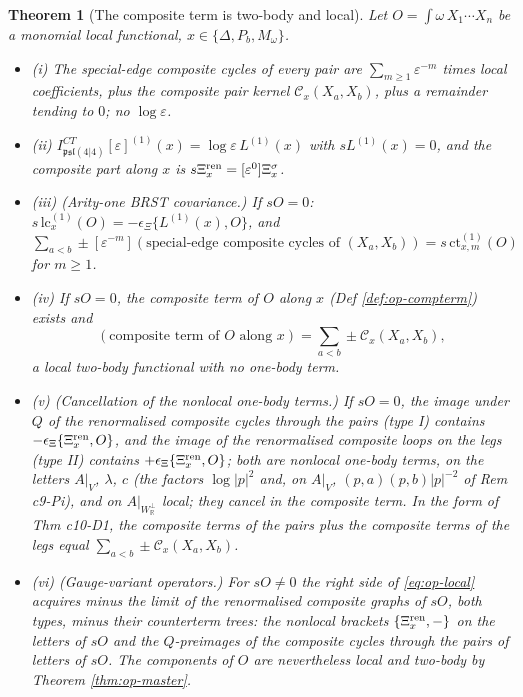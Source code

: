 \documentclass[11pt]{article}
\numberwithin{equation}{section}
\theoremstyle{plain}
\newtheorem{theorem}{Theorem}[section]
\theoremstyle{definition}
\newcommand{\Ap}{A|_{W_{\mathbb R}^\perp}}
\newcommand{\AV}{A|_V}
\newcommand{\psl}{\mathfrak{psl}(4|4)}
\newcommand{\lc}{\mathrm{lc}}
\newcommand{\ct}{\mathrm{ct}}
\newcommand{\Comp}{\mathcal C}
\begin{document}
\begin{theorem}[The composite term is two-body and local]
\label{thm:op-local}
Let $O=\int\omega\,X_1\cdots X_n$ be a monomial local functional, $x\in\{\Delta,P_b,M_\omega\}$.
\begin{itemize}
\item (i) The special-edge composite cycles of every pair are $\sum_{m\ge1}\varepsilon^{-m}$ times local coefficients, plus the composite pair kernel $\Comp_x(X_a,X_b)$, plus a remainder tending to $0$; no $\log\varepsilon$.
\item (ii) $I^{CT}_{\psl}[\varepsilon]^{(1)}(x)=\log\varepsilon\,L^{(1)}(x)$ with $sL^{(1)}(x)=0$, and the composite part along $x$ is $s\Xi^{\rm ren}_x=[\varepsilon^0]\Xi^\sigma_x$.
\item (iii) (Arity-one BRST covariance.) If $sO=0$: $s\,\lc^{(1)}_x(O)=-\epsilon_\Xi\{L^{(1)}(x),O\}$, and $\sum_{a<b}\pm[\varepsilon^{-m}](\text{special-edge composite cycles of }(X_a,X_b))=s\,\ct^{(1)}_{x,m}(O)$ for $m\ge1$.
\item (iv) If $sO=0$, the composite term of $O$ along $x$ (Def \ref{def:op-compterm}) exists and
\begin{equation}
(\text{composite term of }O\text{ along }x)=\sum_{a<b}\pm\Comp_x(X_a,X_b),
\label{eq:op-local}
\end{equation}
a local two-body functional with no one-body term.
\item (v) (Cancellation of the nonlocal one-body terms.) If $sO=0$, the image under $Q$ of the renormalised composite cycles through the pairs (type I) contains $-\epsilon_\Xi\{\Xi^{\rm ren}_x,O\}$, and the image of the renormalised composite loops on the legs (type II) contains $+\epsilon_\Xi\{\Xi^{\rm ren}_x,O\}$; both are nonlocal one-body terms, on the letters $\AV$, $\lambda$, $c$ (the factors $\log|p|^2$ and, on $\AV$, $(p,a)(p,b)|p|^{-2}$ of Rem c9-Pi), and on $\Ap$ local; they cancel in the composite term. In the form of Thm c10-D1, the composite terms of the pairs plus the composite terms of the legs equal $\sum_{a<b}\pm\Comp_x(X_a,X_b)$.
\item (vi) (Gauge-variant operators.) For $sO\neq0$ the right side of \eqref{eq:op-local} acquires minus the limit of the renormalised composite graphs of $sO$, both types, minus their counterterm trees: the nonlocal brackets $\{\Xi^{\rm ren}_x,-\}$ on the letters of $sO$ and the $Q$-preimages of the composite cycles through the pairs of letters of $sO$. The components of $O$ are nevertheless local and two-body by Theorem \ref{thm:op-master}.
\end{itemize}
\end{theorem}
\end{document}

